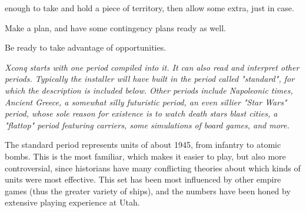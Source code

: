 enough to take and hold a piece of territory, then allow some extra, just
in case.
\par\noindent
Make a plan, and have some contingency plans ready as well.
\par\noindent
Be ready to take advantage of opportunities.
\par\noindent
%
\it Xconq \rm%
starts with one period compiled into it.  It can also read
and interpret other periods.  Typically the installer will have built
in the period called "standard", for which the description is included
below.
Other periods include Napoleonic times, Ancient Greece, a somewhat silly
futuristic period, an even sillier "Star Wars" period, whose sole reason
for existence is to watch death stars blast cities, a "flattop" period
featuring carriers, some simulations of board games, and more.
\par\noindent
The standard period
represents units of about 1945, from infantry to atomic bombs.  This is
the most familiar, which makes it easier to play, but also more controversial,
since historians have many conflicting theories about which kinds of
units were most effective.  This set has been most influenced by other
empire games (thus the greater variety of ships),
and the numbers have been honed by extensive playing experience at Utah.
